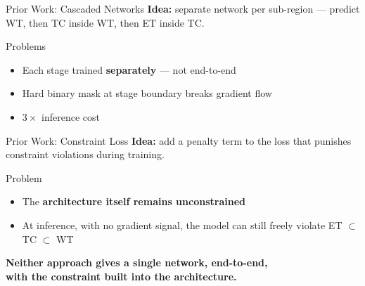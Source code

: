 \documentclass[aspectratio=169]{beamer}
\begin{document}
\begin{frame}{Prior Work: Cascaded Networks}
  \vspace{0.5em}
  \textbf{Idea:} separate network per sub-region — predict WT, then TC inside WT, then ET inside TC.

  \vspace{1em}
  \begin{alertblock}{Problems}
    \begin{itemize}
      \setlength\itemsep{0.5em}
      \item Each stage trained \textbf{separately} — not end-to-end
      \item Hard binary mask at stage boundary breaks gradient flow
      \item $3\times$ inference cost
    \end{itemize}
  \end{alertblock}
\end{frame}

\begin{frame}{Prior Work: Constraint Loss}
  \vspace{0.5em}
  \textbf{Idea:} add a penalty term to the loss that punishes constraint violations during training.

  \vspace{1em}
  \begin{alertblock}{Problem}
    \begin{itemize}
      \setlength\itemsep{0.5em}
      \item The \textbf{architecture itself remains unconstrained}
      \item At inference, with no gradient signal, the model can still freely violate ET $\subset$ TC $\subset$ WT
    \end{itemize}
  \end{alertblock}

  \vspace{1em}
  \begin{center}
    \textbf{Neither approach gives a single network, end-to-end,\\
    with the constraint built into the architecture.}
  \end{center}
\end{frame}
\end{document}
